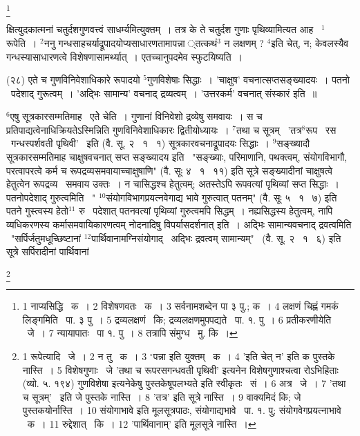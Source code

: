 \documentclass[11pt, openany]{book}
\newcommand\blfootnote[1]{%
 \begingroup
 \renewcommand\thefootnote{}\footnote{#1}%
 \addtocounter{footnote}{-1}%
 \endgroup
}
\begin{document}
\blfootnote{1 नाप्यसिद्धि  \textendash\ क~। 2 विशेषणवतः  \textendash\ क~। 3 सर्वनामशब्देन पा ३ पु.; क~। 4 लक्षणं चिह्नं गमकं लिङ्गमिति  \textendash\ पा. ३ पु~। 5 द्रव्यलक्षणं  \textendash\ कि; द्रव्यलक्षणमुपपद्यते  \textendash\ पा. १. पु~। 6 प्रतीकरणीयेति  \textendash\ जे~। 7 न्यायापातः  \textendash\ पा १. पु~। 8 तत्रापि संमुग्ध  \textendash\ मु. कि~।}

\newpage
क्षित्युदकात्मनां चतुर्दशगुणवत्त्वं साधर्म्यमित्युक्तम्~। तत्र के ते चतुर्दश गुणाः पृथिव्यामित्यत आह \textendash\ ${}^1${\knu रूपेति~।} ${}^2$ननु गन्धसाहचर्याद्रूपादयोप्यसाधारणतामापन्ना ्तत्कथं$^3$ न लक्षणम् ? ${}^4$इति चेत्, न; केवलस्यैव गन्धस्यासाधारणत्वे विशेषणासामर्थ्यात्~। एतच्चानुपदमेव स्फुटयिष्यति~।

\hangindent=2cm {\knu (२८) एते च गुणविनिवेशाधिकारे रूपादयो ${}^5$गुणविशेषाः सिद्धाः~। 'चाक्षुष' वचनात्सप्तसङ्ख्यादयः~। पतनो \textendash\ पदेशाद् गुरूत्वम्~। 'अद्भिः सामान्य' वचनाद् द्रव्यत्वम्~। 'उत्तरकर्म' वचनात् संस्कारं इति~॥}

${}^6$एषु सूत्रकारसम्मतिमाह \textendash\ {\knu एतेे चे}ति~। गुणानां विनिवेशो द्रव्येषु समवायः~। स च प्रतिपाद्यत्वेनाधिक्रियतेऽस्मिन्निति गुणविनिवेशाधिकारः द्वितीयोध्यायः~। ${}^7$तथा च सूत्रम् \textendash\ {\knu 'तत्र$^8$रूप \textendash\ रस \textendash\ गन्धस्पर्शवती पृथिवी'} \textendash\ इति (वै. सू. २ \textendash\ १ \textendash\ १) सूत्रकारवचनाद्रूपादयः सिद्धाः~। ${}^9$सङ्ख्यादौ सूत्रकारसम्मतिमाह {\knu चाक्षुषवचनात् सप्त सङ्ख्यादय इति \textendash\ "सङ्ख्याः, परिमाणानि, पथक्त्वम्, संयोगविभागौ, परत्वापरत्वे कर्म च रूपद्रव्यसमवायाच्चाक्षुषाणि"} (वै. सूः ४ \textendash\ १ \textendash\ ११) इति सूत्रे सङ्ख्यादीनां चाक्षुषत्वे हेतुत्वेन रूपद्रव्य \textendash\ समवाय उक्तः~। न चासिद्धश्च हेतुत्वम्; अतस्तेऽपि रूपवत्यां पृथिव्यां सप्त सिद्धाः~। {\knu पतनोपदेशाद् गुरुत्व}मिति \textendash\ " {\knu${}^10$संयोगविभागप्रयत्नवेगाद्य भावे गुरुत्वात् पतनम्"} (वै. सूः ५ \textendash\ १ \textendash\ ७) इति पतने गुस्त्वस्य हेतो$^11$ रु  \textendash\ पदेशात् पतनवत्यां पृथिव्यां गुरुत्वमपि सिद्धम्~। नह्यसिद्धस्य हेतुत्वम्, नापि व्यधिकरणस्य कर्मासमवायिकारणत्वम् नोदनादिषु विपर्यासदर्शनात् इति~। {\knu अद्भिः सामान्यवचनाद् द्रवत्व}मिति \textendash\ {\knu "सर्पिर्जतुमधूच्छिष्टानां ${}^12$पार्थिवानामग्निसंयोगाद्} \textendash\ अद्भिः {\knu द्रवत्वम् सामान्यम्"} \textendash\ (वै. सू. २ \textendash\ १ \textendash\ ६) इति सूत्रे सर्पिरादीनां पार्थिवानां

\blfootnote{1 रूपेत्यादि  \textendash\ जे~। 2 न तु  \textendash\ क~। 3 ${}^\circ$पन्ना इति युक्तम्  \textendash\ क~। 4 'इति चेत् न' इति क पुस्तके नास्ति~। 5 विशेषगुणाः \textendash\ जे 'तथा च रूपरसगन्धवती पृथिवी' इत्यनेन विशेषगुणाश्चत्वा रोऽभिहिताः (व्यो. ५. १९४) गुणविशेषा इत्यनेकेषु पुस्तकेषूपलभ्यते इति स्वीकृतः \textendash\ सं~। 6 अत्र \textendash\ जे~। 7 'तथा च सूत्रम्' \textendash\ इति जे पुस्तके नास्ति~। 8 'तत्र' इति सूत्रे नास्ति~। 9 वाक्यमिदं कि; जे पुस्तकयोर्नास्ति~। 10 संयोगाभावे इति मूलसूत्रपाठः, संयोगाद्यभावे \textendash\ पा. १. पु; संयोगवेगप्रयत्नाभावे  \textendash\ क~। 11 रुद्देशात् \textendash\ कि~। 12 'पार्थिवानाम्' इति मूलसूत्रे नास्ति~।}
\end{document}
